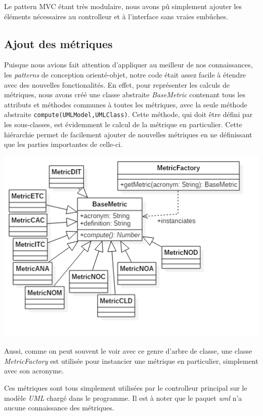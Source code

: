 \documentclass[letter,french]{report}
\begin{document}
  Le pattern MVC étant très modulaire, nous avons pû simplement ajouter les
  éléments nécessaires au controlleur et à l'interface sans vraies embûches.
	
	\subsection*{Ajout des métriques}
  Puisque nous avions fait attention d'appliquer au meilleur de nos
  connaissances, les \emph{patterns} de conception orienté-objet, notre code
  était assez facile à étendre avec des nouvelles fonctionalités. En effet, pour
  représenter les calculs de métriques, nous avons créé une classe abstraite
  \emph{BaseMetric} contenant tous les attributs et méthodes communes à toutes
  les métriques, avec la seule méthode abstraite
  \texttt{compute(UMLModel,UMLClass)}. Cette méthode, qui doit être défini par
  les sous-classes, est évidemment le calcul de la métrique en particulier.
  Cette hiérarchie permet de facilement ajouter de nouvelles métriques en ne
  définissant que les parties importantes de celle-ci.
  \begin{center}
	\includegraphics[scale=.6]{images/Metrics_diagram.png}
  \end{center}

  Aussi, comme on peut souvent le voir avec ce genre d'arbre de classe, une
  classe \emph{MetricFactory} est utilisée pour instancier une métrique en
  particulier, simplement avec son acronyme.

  Ces métriques sont tous simplement utilisées par le controlleur principal
  sur le modèle \emph{UML} chargé dans le programme. Il est à noter que le
  paquet \emph{uml} n'a aucune connaissance des métriques.
	
\end{document}
